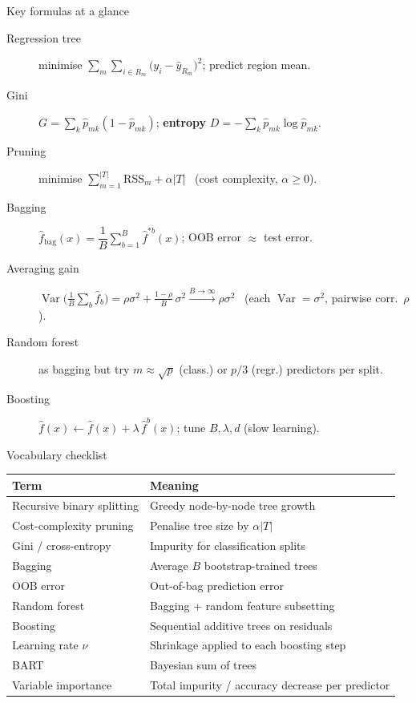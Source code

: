 \documentclass[aspectratio=169,11pt]{beamer}
\begin{document}
\begin{frame}{Key formulas at a glance}
  \footnotesize
  \begin{description}
    \item[Regression tree] minimise $\sum_{m}\sum_{i\in R_m}\big(y_i-\hat y_{R_m}\big)^2$; predict region mean.
    \item[Gini] $G=\sum_{k}\hat p_{mk}(1-\hat p_{mk})$; \quad \textbf{entropy} $D=-\sum_k \hat p_{mk}\log \hat p_{mk}$.
    \item[Pruning] minimise $\sum_{m=1}^{|T|}\mathrm{RSS}_m+\alpha|T|$ \ (cost complexity, $\alpha\ge0$).
    \item[Bagging] $\hat f_{\mathrm{bag}}(x)=\dfrac1B\sum_{b=1}^{B}\hat f^{*b}(x)$; OOB error $\approx$ test error.
    \item[Averaging gain] $\operatorname{Var}\!\big(\tfrac1B\sum_b \hat f_b\big)=\rho\sigma^2+\frac{1-\rho}{B}\,\sigma^2 \xrightarrow{B\to\infty} \rho\sigma^2$ \ (each $\operatorname{Var}=\sigma^2$, pairwise corr.\ $\rho$).
    \item[Random forest] as bagging but try $m\approx\sqrt{p}$ (class.) or $p/3$ (regr.) predictors per split.
    \item[Boosting] $\hat f(x)\leftarrow \hat f(x)+\lambda\,\hat f^{b}(x)$; tune $B,\lambda,d$ (slow learning).
  \end{description}
\end{frame}

\begin{frame}{Vocabulary checklist}
  \footnotesize
  \begin{tabular}{ll}
    \toprule
    \textbf{Term} & \textbf{Meaning} \\
    \midrule
    Recursive binary splitting & Greedy node-by-node tree growth \\
    Cost-complexity pruning & Penalise tree size by $\alpha |T|$ \\
    Gini / cross-entropy & Impurity for classification splits \\
    Bagging & Average $B$ bootstrap-trained trees \\
    OOB error & Out-of-bag prediction error \\
    Random forest & Bagging + random feature subsetting \\
    Boosting & Sequential additive trees on residuals \\
    Learning rate $\nu$ & Shrinkage applied to each boosting step \\
    BART & Bayesian sum of trees \\
    Variable importance & Total impurity / accuracy decrease per predictor \\
    \bottomrule
  \end{tabular}
\end{frame}
\end{document}
